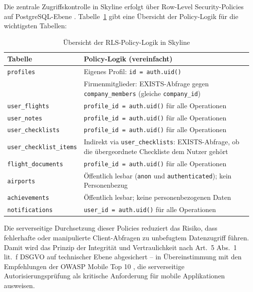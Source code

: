 Die zentrale Zugriffskontrolle in Skyline erfolgt über
Row-Level Security-Policies auf PostgreSQL-Ebene \cite{supabaseRLS}.
Tabelle~\ref{tab:rls_uebersicht} gibt eine Übersicht der
Policy-Logik für die wichtigsten Tabellen:

\begin{table}[H]
  \centering
  \caption{Übersicht der RLS-Policy-Logik in Skyline}
  \label{tab:rls_uebersicht}
  \begin{tabularx}{\textwidth}{l X}
    \toprule
    \textbf{Tabelle} & \textbf{Policy-Logik (vereinfacht)} \\
    \midrule
    \texttt{profiles}
      & Eigenes Profil: \texttt{id = auth.uid()} \\
      & Firmenmitglieder: EXISTS-Abfrage gegen \texttt{company\_members}
        (gleiche \texttt{company\_id}) \\
    \texttt{user\_flights}
      & \texttt{profile\_id = auth.uid()} für alle Operationen \\
    \texttt{user\_notes}
      & \texttt{profile\_id = auth.uid()} für alle Operationen \\
    \texttt{user\_checklists}
      & \texttt{profile\_id = auth.uid()} für alle Operationen \\
    \texttt{user\_checklist\_items}
      & Indirekt via \texttt{user\_checklists}: EXISTS-Abfrage,
        ob die übergeordnete Checkliste dem Nutzer gehört \\
    \texttt{flight\_documents}
      & \texttt{profile\_id = auth.uid()} für alle Operationen \\
    \texttt{airports}
      & Öffentlich lesbar (\texttt{anon} und \texttt{authenticated});
        kein Personenbezug \\
    \texttt{achievements}
      & Öffentlich lesbar; keine personenbezogenen Daten \\
    \texttt{notifications}
      & \texttt{user\_id = auth.uid()} für alle Operationen \\
    \bottomrule
  \end{tabularx}
\end{table}

Die serverseitige Durchsetzung dieser Policies reduziert das Risiko,
dass fehlerhafte oder manipulierte Client-Abfragen zu unbefugtem
Datenzugriff führen.
Damit wird das Prinzip der Integrität und Vertraulichkeit nach
Art.~5 Abs.~1 lit.~f DSGVO auf technischer Ebene abgesichert --
in Übereinstimmung mit den Empfehlungen der
OWASP Mobile Top 10 \cite{owaspMobileTop10},
die serverseitige Autorisierungsprüfung als kritische Anforderung
für mobile Applikationen ausweisen.

